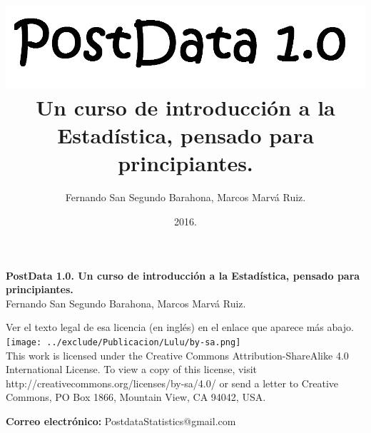 \documentclass[10pt,a4paper]{book}
\begin{document}
	
	\frontmatter
	
	
	\author{Fernando San Segundo Barahona, Marcos Marvá Ruiz.}
	\title{
		\includegraphics[width=14cm]{../fig/frontispicio.png}\\[5mm]
		{\small
			Un curso de introducción a la Estadística, pensado para principiantes.}
	}
	\date{\small 2016.}
	
	\VerbatimFootnotes
	
	
	\maketitle
	
	\newpage
	
	\thispagestyle{empty}
	
	\small
	\noindent \textbf{PostData 1.0. Un curso de introducción a la Estadística, pensado para principiantes. } \\
	Fernando San Segundo Barahona, Marcos Marvá Ruiz.
	
	\vspace{1cm}
	  Ver el texto legal de esa licencia (en inglés) en el enlace que aparece más abajo.\\
	\noindent\texttt{[image: ../exclude/Publicacion/Lulu/by-sa.png]}\\
	{%
		\noindent
		This work is licensed under the Creative Commons Attribution-ShareAlike 4.0 International License. To view a copy of this license, visit http://creativecommons.org/licenses/by-sa/4.0/ or send a letter to Creative Commons, PO Box 1866, Mountain View, CA 94042, USA.}
	
	\vspace{2cm}
	\noindent
	{\bf Correo electrónico:} PostdataStatistics@gmail.com
	
\end{document}
